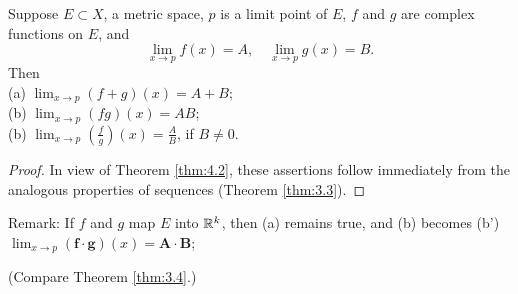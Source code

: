 \begin{thm}
    \label{thm:4.4}
    Suppose $E \subset X$, a metric space, $p$ is a limit point of $E$, $f$ and $g$ are complex functions on $E$, and
    \begin{equation*}
        \lim_{x \to p} f(x) = A, \quad
        \lim_{x \to p} g(x) = B.
    \end{equation*}
    Then \\
    (a) $\lim_{x \to p} (f + g)(x) = A + B$; \\
    (b) $\lim_{x \to p} (f   g)(x) = A   B$; \\
    (b) $\lim_{x \to p} (\frac{f}{g})(x) = \frac{A}{B}$, if $B \neq 0$. \\
\end{thm}

\begin{proof}
    In view of Theorem \ref{thm:4.2}, these assertions follow immediately from the analogous properties of sequences (Theorem \ref{thm:3.3}).
\end{proof}

Remark:
    If $f$ and $g$ map $E$ into ${\protect\mathbb R}^{k}$, 
    then (a) remains true, 
    and (b) becomes (b') 
    $\lim_{x \to p} (\mathbf{f} \cdot \mathbf{g})(x) = \mathbf{A \cdot B}$;

(Compare Theorem \ref{thm:3.4}.)